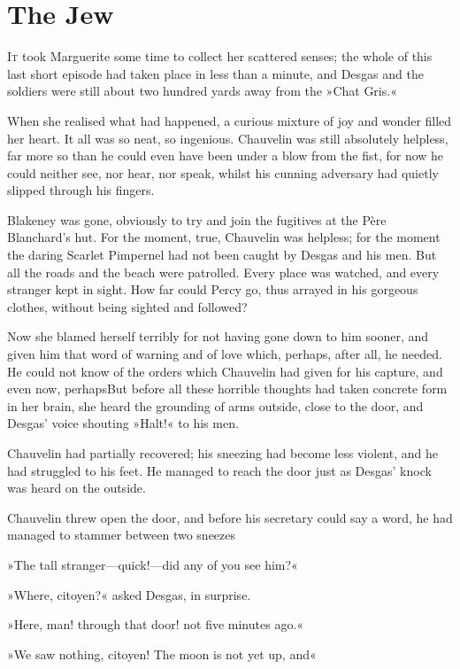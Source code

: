 
\chapter{The Jew}
\lettrine[lines=4]{I}{t} took Marguerite some time to collect her scattered senses; the whole of this last short episode had taken place in less than a minute, and Desgas and the soldiers were still about two hundred yards away from the »Chat Gris.«

When she realised what had happened, a curious mixture of joy and wonder filled her heart. It all was so neat, so ingenious. Chauvelin was still absolutely helpless, far more so than he could even have been under a blow from the fist, for now he could neither see, nor hear, nor speak, whilst his cunning adversary had quietly slipped through his fingers.

Blakeney was gone, obviously to try and join the fugitives at the Père Blanchard's hut. For the moment, true, Chauvelin was helpless; for the moment the daring Scarlet Pimpernel had not been caught by Desgas and his men. But all the roads and the beach were patrolled. Every place was watched, and every stranger kept in sight. How far could Percy go, thus arrayed in his gorgeous clothes, without being sighted and followed?

Now she blamed herself terribly for not having gone down to him sooner, and given him that word of warning and of love which, perhaps, after all, he needed. He could not know of the orders which Chauvelin had given for his capture, and even now, perhaps\textellipsis \allowbreak  But before all these horrible thoughts had taken concrete form in her brain, she heard the grounding of arms outside, close to the door, and Desgas' voice shouting »Halt!« to his men.

Chauvelin had partially recovered; his sneezing had become less violent, and he had struggled to his feet. He managed to reach the door just as Desgas' knock was heard on the outside.

Chauvelin threw open the door, and before his secretary could say a word, he had managed to stammer between two sneezes\longdash


»The tall stranger—quick!—did any of you see him?«

»Where, citoyen?« asked Desgas, in surprise.

»Here, man! through that door! not five minutes ago.«

»We saw nothing, citoyen! The moon is not yet up, and\textellipsis«

